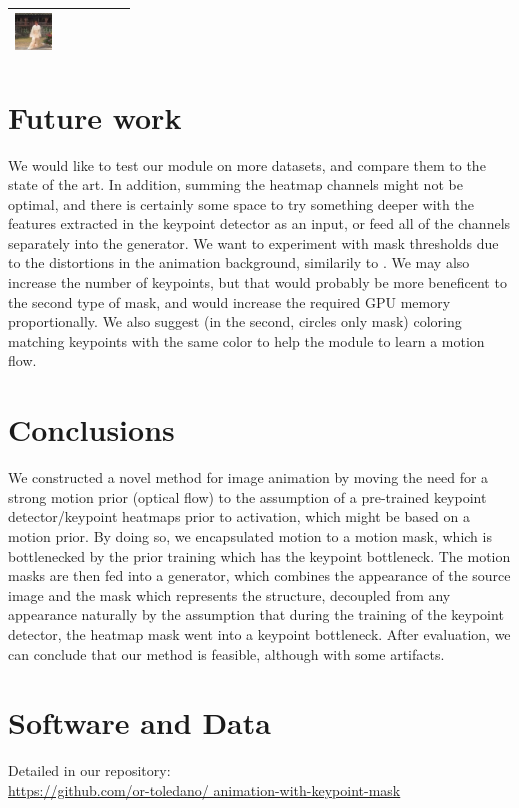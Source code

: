 \documentclass{article}
\begin{document}
\begin{table}[t]
\begin{center}
\begin{small}
\begin{sc}
\begin{tabular}{m{1.0cm}m{1.0cm}m{1.0cm}m{1.0cm}m{1.0cm}m{1.0cm}}
\includegraphics[width=1cm, height=1cm]{images/softmax/06.png} \\
\bottomrule
\end{tabular}
\end{sc}
\end{small}
\end{center}
\vskip -0.1in
\end{table}


\section{Future work}
\label{future}
We would like to test our module on more datasets, and compare them to the
state of the art. In addition, summing the heatmap channels might not be
optimal, and there is certainly some space to try something deeper with the
features extracted in the keypoint detector as an input, or feed all of the
channels separately into the generator. We want to experiment with
mask thresholds due to the distortions in the animation background,
similarily to \cite{shalev2020image}.
We may also increase the number of keypoints, but that would probably be
more beneficent to the second type of mask, and would increase the
required GPU memory proportionally. We also suggest (in the second, circles
only mask) coloring
matching keypoints with the same color to help the module to learn a motion
flow.

\section{Conclusions}
We constructed a novel method for image animation by moving the need for
a strong motion prior (optical flow) to the assumption of a pre-trained
keypoint detector/keypoint heatmaps prior to activation, which might be
based on a motion prior.
By doing so, we encapsulated motion to a motion mask, which is
bottlenecked by the prior training which has the keypoint bottleneck.
The motion masks are then fed into a generator, which combines the
appearance of the source image and the mask which represents the structure,
decoupled from any appearance naturally by the assumption that during the
training of the keypoint detector, the heatmap mask went into a keypoint
bottleneck. After evaluation, we can conclude that our method is
feasible, although with some artifacts.
\section*{Software and Data}
Detailed in our repository:
\\
\url{https://github.com/or-toledano/
animation-with-keypoint-mask}


\end{document}
